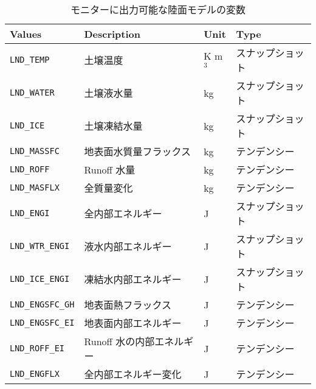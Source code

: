 \begin{table}[h]
\begin{center}
  \caption{モニターに出力可能な陸面モデルの変数}
  \label{tab:varlist_monitor_land}
  \begin{tabularx}{150mm}{|l|X|l|l|} \hline
    \rowcolor[gray]{0.9}  Values & Description & Unit & Type \\ \hline
      \verb|LND_TEMP|      & 土壌温度                & K m$^3$ & スナップショット \\
      \verb|LND_WATER|     & 土壌液水量               & kg   & スナップショット \\
      \verb|LND_ICE|       & 土壌凍結水量             & kg   & スナップショット \\
      \verb|LND_MASSFC|    & 地表面水質量フラックス    & kg   & テンデンシー \\
      \verb|LND_ROFF|      & Runoff 水量             & kg   & テンデンシー \\
      \verb|LND_MASFLX|    & 全質量変化               & kg   & テンデンシー \\
      \verb|LND_ENGI|      & 全内部エネルギー          & J    & スナップショット \\
      \verb|LND_WTR_ENGI|  & 液水内部エネルギー        & J    & スナップショット \\
      \verb|LND_ICE_ENGI|  & 凍結水内部エネルギー      & J    & スナップショット \\
      \verb|LND_ENGSFC_GH| & 地表面熱フラックス        & J    & テンデンシー \\
      \verb|LND_ENGSFC_EI| & 地表面内部エネルギー      & J    & テンデンシー \\
      \verb|LND_ROFF_EI|   & Runoff 水の内部エネルギー & J    & テンデンシー \\
      \verb|LND_ENGFLX|    & 全内部エネルギー変化      & J    & テンデンシー \\
    \hline
  \end{tabularx}
\end{center}
\end{table}

